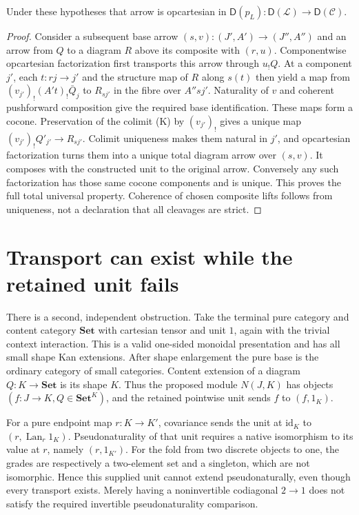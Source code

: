 \documentclass[11pt]{article}
\begin{document}
\begin{proposition}
Under these hypotheses that arrow is opcartesian in $\mathsf D(p_L):\mathsf D(\mathcal L)\to\mathsf D(\mathcal C)$.
\end{proposition}
\begin{proof}
Consider a subsequent base arrow $(s,v):(J',A')\to(J'',A'')$ and an arrow from $Q$ to a diagram $R$ above its composite with $(r,u)$. Componentwise opcartesian factorization first transports this arrow through $u_!Q$. At a component $j'$, each $t:rj\to j'$ and the structure map of $R$ along $s(t)$ then yield a map from $(v_{j'})_!(A't)_!\bar Q_j$ to $R_{s j'}$ in the fibre over $A''s j'$. Naturality of $v$ and coherent pushforward composition give the required base identification. These maps form a cocone. Preservation of the colimit (K) by $(v_{j'})_!$ gives a unique map $(v_{j'})_!Q'_{j'}\to R_{s j'}$. Colimit uniqueness makes them natural in $j'$, and opcartesian factorization turns them into a unique total diagram arrow over $(s,v)$. It composes with the constructed unit to the original arrow. Conversely any such factorization has those same cocone components and is unique. This proves the full total universal property. Coherence of chosen composite lifts follows from uniqueness, not a declaration that all cleavages are strict.
\end{proof}

\section{Transport can exist while the retained unit fails}
There is a second, independent obstruction. Take the terminal pure category and content category $\mathbf{Set}$ with cartesian tensor and unit $1$, again with the trivial context interaction. This is a valid one-sided monoidal presentation and has all small shape Kan extensions. After shape enlargement the pure base is the ordinary category of small categories. Content extension of a diagram $Q:K\to\mathbf{Set}$ is its shape $K$. Thus the proposed module $N(J,K)$ has objects $(f:J\to K,Q\in\mathbf{Set}^K)$, and the retained pointwise unit sends $f$ to $(f,1_K)$.

For a pure endpoint map $r:K\to K'$, covariance sends the unit at $\mathrm{id}_K$ to $(r,\operatorname{Lan}_r1_K)$. Pseudonaturality of that unit requires a native isomorphism to its value at $r$, namely $(r,1_{K'})$. For the fold from two discrete objects to one, the grades are respectively a two-element set and a singleton, which are not isomorphic. Hence this supplied unit cannot extend pseudonaturally, even though every transport exists. Merely having a noninvertible codiagonal $2\to1$ does not satisfy the required invertible pseudonaturality comparison.
\end{document}
